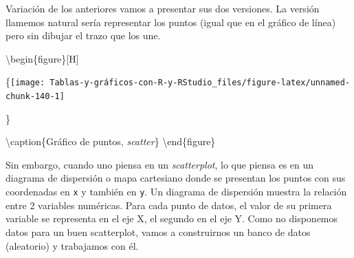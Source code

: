 \documentclass[
]{book}
\newenvironment{Shaded}{\begin{snugshade}}{\end{snugshade}}
\newcommand{\AttributeTok}[1]{\textcolor[rgb]{0.77,0.63,0.00}{#1}}
\newcommand{\ConstantTok}[1]{\textcolor[rgb]{0.00,0.00,0.00}{#1}}
\newcommand{\FunctionTok}[1]{\textcolor[rgb]{0.00,0.00,0.00}{#1}}
\newcommand{\NormalTok}[1]{#1}
\newcommand{\SpecialCharTok}[1]{\textcolor[rgb]{0.00,0.00,0.00}{#1}}
\newcommand{\StringTok}[1]{\textcolor[rgb]{0.31,0.60,0.02}{#1}}
\begin{document}
Variación de los anteriores vamos a presentar sus dos versiones. La versión llamemos natural sería representar los puntos (igual que en el gráfico de línea) pero sin dibujar el trazo que los une.

\begin{Shaded}
\end{Shaded}

\textbackslash begin\{figure\}{[}H{]}

\{\centering \texttt{[image: Tablas-y-gráficos-con-R-y-RStudio\_files/figure-latex/unnamed-chunk-140-1]}

\}

\textbackslash caption\{Gráfico de puntos, \emph{scatter}\}\label{fig:unnamed-chunk-140}
\textbackslash end\{figure\}

Sin embargo, cuando uno piensa en un \emph{scatterplot}, lo que piensa es en un diagrama de dispersión o mapa cartesiano donde se presentan los puntos con sus coordenadas en \texttt{x} y también en \texttt{y}. Un diagrama de dispersión muestra la relación entre 2 variables numéricas. Para cada punto de datos, el valor de su primera variable se representa en el eje X, el segundo en el eje Y. Como no disponemos datos para un buen scatterplot, vamos a construirnos un banco de datos (aleatorio) y trabajamos con él.
\end{document}
